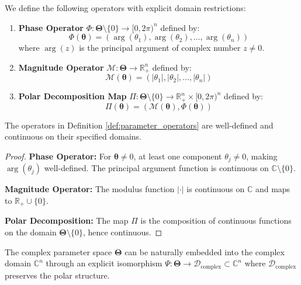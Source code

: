 \begin{definition}
\label{def:parameter_operators}
We define the following operators with explicit domain restrictions:

\begin{enumerate}
\item \textbf{Phase Operator} $\Phi: \boldsymbol{\Theta} \setminus \{0\} \rightarrow [0, 2\pi)^n$ defined by:
$$\Phi(\boldsymbol{\theta}) = (\arg(\theta_1), \arg(\theta_2), \ldots, \arg(\theta_n))$$
where $\arg(z)$ is the principal argument of complex number $z \neq 0$.

\item \textbf{Magnitude Operator} $\mathcal{M}: \boldsymbol{\Theta} \rightarrow \mathbb{R}^n_+$ defined by:
$$\mathcal{M}(\boldsymbol{\theta}) = (|\theta_1|, |\theta_2|, \ldots, |\theta_n|)$$

\item \textbf{Polar Decomposition Map} $\Pi: \boldsymbol{\Theta} \setminus \{0\} \rightarrow \mathbb{R}^n_+ \times [0, 2\pi)^n$ defined by:
$$\Pi(\boldsymbol{\theta}) = (\mathcal{M}(\boldsymbol{\theta}), \Phi(\boldsymbol{\theta}))$$
\end{enumerate}
\end{definition}

\begin{lemma}
\label{lem:operator_welldef}
The operators in Definition \ref{def:parameter_operators} are well-defined and continuous on their specified domains.
\end{lemma}

\begin{proof}
\textbf{Phase Operator:} For $\boldsymbol{\theta} \neq 0$, at least one component $\theta_j \neq 0$, making $\arg(\theta_j)$ well-defined. The principal argument function is continuous on $\mathbb{C} \setminus \{0\}$.

\textbf{Magnitude Operator:} The modulus function $|\cdot|$ is continuous on $\mathbb{C}$ and maps to $\mathbb{R}_+ \cup \{0\}$.

\textbf{Polar Decomposition:} The map $\Pi$ is the composition of continuous functions on the domain $\boldsymbol{\Theta} \setminus \{0\}$, hence continuous.
\end{proof}

\begin{theorem}
\label{thm:complex_domain_embedding}
The complex parameter space $\boldsymbol{\Theta}$ can be naturally embedded into the complex domain $\mathbb{C}^n$ through an explicit isomorphism $\Psi: \boldsymbol{\Theta} \rightarrow \mathcal{D}_{\text{complex}} \subset \mathbb{C}^n$ where $\mathcal{D}_{\text{complex}}$ preserves the polar structure.
\end{theorem}

